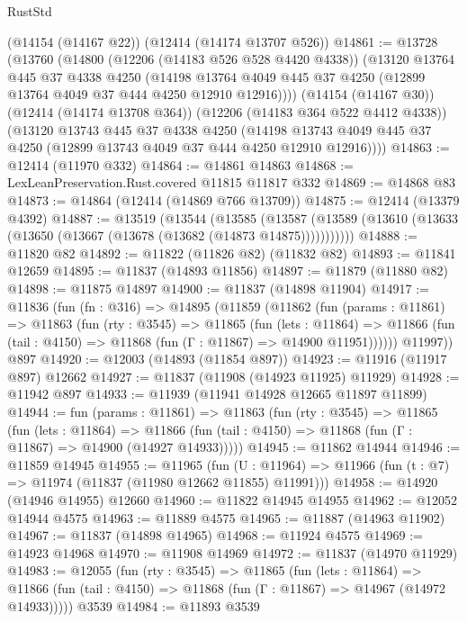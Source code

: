 \begin{lexlean}{RustStd}
\begin{coremodule}
    (@14154 (@14167 @22))
    (@12414 (@14174 @13707 @526))
@14861 := @13728
    (@13760
      (@14800
        (@12206 (@14183 @526 @528 @4420 @4338))
        (@13120
          @13764
          @445
          @37
          @4338
          @4250
          (@14198 @13764 @4049 @445 @37 @4250 (@12899 @13764 @4049 @37 @444 @4250 @12910 @12916))))
      (@14154 (@14167 @30))
      (@12414 (@14174 @13708 @364))
      (@12206 (@14183 @364 @522 @4412 @4338))
      (@13120
        @13743
        @445
        @37
        @4338
        @4250
        (@14198 @13743 @4049 @445 @37 @4250 (@12899 @13743 @4049 @37 @444 @4250 @12910 @12916))))
@14863 := @12414 (@11970 @332)
@14864 := @14861 @14863
@14868 := LexLeanPreservation.Rust.covered @11815 @11817 @332
@14869 := @14868 @83
@14873 := @14864 (@12414 (@14869 @766 @13709))
@14875 := @12414 (@13379 @4392)
@14887 := @13519
    (@13544
      (@13585
        (@13587 (@13589 (@13610 (@13633 (@13650 (@13667 (@13678 (@13682 (@14873 @14875)))))))))))
@14888 := @11820 @82
@14892 := @11822 (@11826 @82) (@11832 @82)
@14893 := @11841 @12659
@14895 := @11837 (@14893 @11856)
@14897 := @11879 (@11880 @82)
@14898 := @11875 @14897
@14900 := @11837 (@14898 @11904)
@14917 := @11836
    (fun (fn : @316) =>
    @14895
      (@11859
        (@11862
          (fun (params : @11861) =>
          @11863
            (fun (rty : @3545) =>
            @11865
              (fun (lets : @11864) =>
              @11866 (fun (tail : @4150) => @11868 (fun (Γ : @11867) => @14900 @11951))))))
        @11997))
    @897
@14920 := @12003 (@14893 (@11854 @897))
@14923 := @11916 (@11917 @897) @12662
@14927 := @11837 (@11908 (@14923 @11925) @11929)
@14928 := @11942 @897
@14933 := @11939 (@11941 @14928 @12665 @11897 @11899)
@14944 := fun (params : @11861) =>
  @11863
    (fun (rty : @3545) =>
    @11865
      (fun (lets : @11864) =>
      @11866 (fun (tail : @4150) => @11868 (fun (Γ : @11867) => @14900 (@14927 @14933)))))
@14945 := @11862 @14944
@14946 := @11859 @14945
@14955 := @11965
    (fun (U : @11964) => @11966 (fun (t : @7) => @11974 (@11837 (@11980 @12662 @11855) @11991)))
@14958 := @14920 (@14946 @14955) @12660
@14960 := @11822 @14945 @14955
@14962 := @12052 @14944 @4575
@14963 := @11889 @4575
@14965 := @11887 (@14963 @11902)
@14967 := @11837 (@14898 @14965)
@14968 := @11924 @4575
@14969 := @14923 @14968
@14970 := @11908 @14969
@14972 := @11837 (@14970 @11929)
@14983 := @12055
    (fun (rty : @3545) =>
    @11865
      (fun (lets : @11864) =>
      @11866 (fun (tail : @4150) => @11868 (fun (Γ : @11867) => @14967 (@14972 @14933)))))
    @3539
@14984 := @11893 @3539

\end{coremodule}
\end{lexlean}
